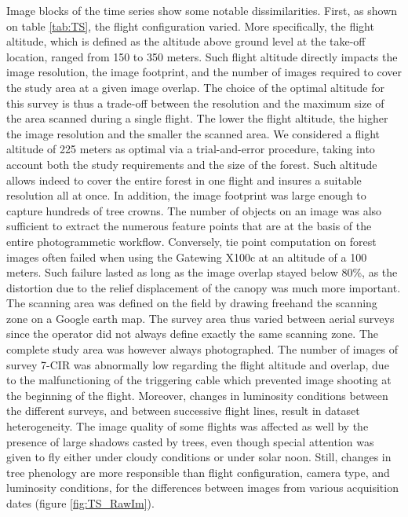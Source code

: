 \documentclass[remotesensing,article,submit,moreauthors,pdftex,12pt,a4paper]{mdpi} %
\begin{document}
Image blocks of the time series show some notable dissimilarities. 
First, as shown on table \ref{tab:TS}, the flight configuration varied. 
More specifically, the flight altitude, which is defined as the altitude above ground level at the take-off location, ranged from 150 to 350 meters. 
Such flight altitude directly impacts the image resolution, the image footprint, and the number of images required to cover the study area at a given image overlap. 
The choice of the optimal altitude for this survey is thus a trade-off between the resolution and the maximum size of the area scanned during a single flight. 
The lower the flight altitude, the higher the image resolution and the smaller the scanned area.
We considered a flight altitude of 225 meters as optimal via a trial-and-error procedure, taking into account both the study requirements and the size of the forest.
Such altitude allows indeed to cover the entire forest in one flight and insures a suitable resolution all at once.
In addition, the image footprint was large enough to capture hundreds of tree crowns. 
The number of objects on an image was also sufficient to extract the numerous feature points that are at the basis of the entire photogrammetic workflow. 
Conversely, tie point computation on forest images often failed when using the Gatewing X100c at an altitude of a 100 meters. Such failure lasted as long as the image overlap stayed below 80\%, as the distortion due to the relief displacement of the canopy was much more important. 
The scanning area was defined on the field by drawing freehand the scanning zone on a Google earth map. 
The survey area thus varied between aerial surveys since the operator did not always define exactly the same scanning zone. The complete study area was however always photographed. 
The number of images of survey 7-CIR was abnormally low regarding the flight altitude and overlap, due to the malfunctioning of the triggering cable which prevented image shooting at the beginning of the flight. 
Moreover, changes in luminosity conditions between the different surveys, and between successive flight lines, result in dataset heterogeneity. 
The image quality of some flights was affected as well by the presence of large shadows casted by trees, even though special attention was given to fly either under cloudy conditions or under solar noon. 
Still, changes in tree phenology are more responsible than flight configuration, camera type, and luminosity conditions, for the differences between images from various acquisition dates (figure \ref{fig:TS_RawIm}).
\end{document}
